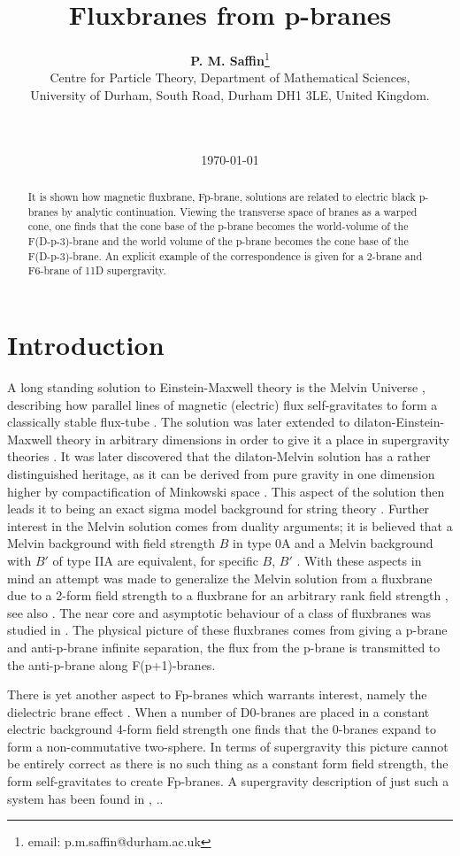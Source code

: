 \documentclass[a4paper,11pt]{article}
\title{{\bf Fluxbranes from p-branes}}
\author{{\bf P. M. Saffin}\thanks{email: p.m.saffin@durham.ac.uk}
\\ Centre for Particle Theory, Department of Mathematical Sciences, \\
University of Durham, South Road, Durham DH1 3LE, 
United Kingdom.\\
\\ \\ 
}
\date{\today}
\begin{document}
\maketitle
\begin{abstract}
It is shown how
magnetic fluxbrane, Fp-brane, solutions 
are related to electric
black p-branes by analytic continuation. Viewing 
the transverse space of branes as a warped cone, one finds that
the cone base of the p-brane
becomes the world-volume of the F(D-p-3)-brane and the
world volume of the p-brane becomes the cone base of
the F(D-p-3)-brane.
An explicit
example of the correspondence is given for a 2-brane  and
F6-brane of 11D supergravity.
\end{abstract}


\section{Introduction}

A long standing solution to Einstein-Maxwell theory is the Melvin
Universe \cite{melvin64},
describing how parallel lines of magnetic (electric)
flux self-gravitates to form a classically stable flux-tube
\cite{thorne65}.
The solution was later extended to dilaton-Einstein-Maxwell
theory in arbitrary dimensions
in order to give it a place in supergravity theories
\cite{gibbons88}. 
It was later discovered that the dilaton-Melvin solution has
a rather distinguished heritage, as it can be derived from pure
gravity in one dimension higher by compactification of Minkowski
space \cite{dowker94}. This aspect of the solution then leads
it to being an exact sigma model background for string theory
\cite{tseytlin95}. Further interest in the Melvin solution comes
from duality arguments; it is
believed that a Melvin background with field strength $B$
in type 0A and a Melvin
background with $B'$ of type IIA are equivalent, for specific
$B$, $B'$ \cite{0AIIA}.
With these aspects in mind an attempt was made to generalize the
Melvin solution from a fluxbrane due to a 2-form field strength to
a fluxbrane for an arbitrary rank field strength \cite{saffin01},
see also \cite{galtsov99}.
The near core and asymptotic behaviour of a
class of fluxbranes was studied in \cite{gutperle01}.
The physical picture of these fluxbranes comes from giving a
p-brane and anti-p-brane infinite separation, the flux from the
p-brane is transmitted to the anti-p-brane along F(p+1)-branes.

There is yet another aspect to Fp-branes which warrants
interest, namely the dielectric brane effect \cite{myers99}. When
a number of D0-branes are placed in a constant electric
background 4-form field strength one finds that the 0-branes expand
to form a non-commutative two-sphere. In terms of supergravity this
picture cannot be entirely correct as there is no such thing as
a constant form field strength, the form self-gravitates to create
Fp-branes. A supergravity description of just such a system has been
found in \cite{emparan01}, \cite{herdeiro01}..
\end{document}
